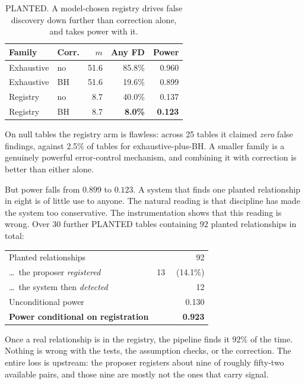 \documentclass[10pt,twocolumn]{article}
\begin{document}
\begin{table}[t]
\centering\small
\setlength{\tabcolsep}{3.5pt}
\begin{tabular}{@{}llrrr@{}}
\toprule
\textbf{Family} & \textbf{Corr.} & \textbf{$m$} & \textbf{Any FD} & \textbf{Power} \\
\midrule
Exhaustive & no  & 51.6 & 85.8\% & 0.960 \\
Exhaustive & BH  & 51.6 & 19.6\% & 0.899 \\
Registry   & no  & \phantom{0}8.7 & 40.0\% & 0.137 \\
Registry   & BH  & \phantom{0}8.7 & \textbf{\phantom{0}8.0\%} & \textbf{0.123} \\
\bottomrule
\end{tabular}
\caption{PLANTED. A model-chosen registry drives false discovery down further
than correction alone, and takes power with it.}
\label{tab:registry}
\vspace{-4mm}
\end{table}

On null tables the registry arm is flawless: across 25 tables it claimed
\emph{zero} false findings, against 2.5\% of tables for exhaustive-plus-BH. A
smaller family is a genuinely powerful error-control mechanism, and combining it
with correction is better than either alone.

But power falls from $0.899$ to $0.123$. A system that finds one planted
relationship in eight is of little use to anyone. The natural reading is that
discipline has made the system too conservative. The instrumentation shows that
this reading is wrong. Over 30 further PLANTED tables containing 92 planted
relationships in total:

\begin{center}\small
\begin{tabular}{@{}lr@{}}
\toprule
Planted relationships & 92 \\
\dots\ the proposer \emph{registered} & 13 \ \ (14.1\%) \\
\dots\ the system then \emph{detected} & 12 \\
\midrule
Unconditional power & 0.130 \\
\textbf{Power conditional on registration} & \textbf{0.923} \\
\bottomrule
\end{tabular}
\end{center}

\noindent
Once a real relationship is in the registry, the pipeline finds it $92\%$ of the
time. Nothing is wrong with the tests, the assumption checks, or the correction.
The entire loss is upstream: the proposer registers about nine of roughly
fifty-two available pairs, and those nine are mostly not the ones that carry
signal.
\end{document}
